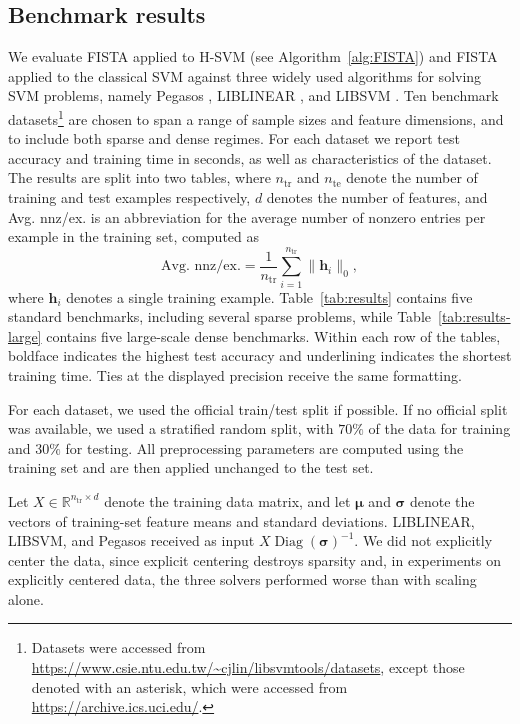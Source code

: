 \documentclass[twoside,11pt]{article}
\newcommand{\bmu}{\bm{\mu}}
\newcommand{\R}{{\mathbb{R}}} %
\newcommand{\Diag}{\mathop{\mathrm{Diag}}}
\newcommand\h{\bm{h}}
\newcommand\bsigma{\bm{\sigma}}
\begin{document}
\subsection{Benchmark results}
We evaluate FISTA applied to H-SVM (see Algorithm~\ref{alg:FISTA}) and FISTA applied to the classical SVM against three widely used algorithms for solving SVM problems, namely Pegasos \citep{Pegasos}, LIBLINEAR \citep{LIBLINEAR}, and LIBSVM \citep{LIBSVM}. Ten benchmark datasets\footnote{Datasets were accessed from \url{https://www.csie.ntu.edu.tw/~cjlin/libsvmtools/datasets}, except those denoted with an asterisk, which were accessed from \url{https://archive.ics.uci.edu/}.} are chosen to span a range of sample sizes and feature dimensions, and to include both sparse and dense regimes. For each dataset we report test accuracy and training time in seconds, as well as characteristics of the dataset. The results are split into two tables, where $n_{\text{tr}}$ and $n_{\text{te}}$ denote the number of training and test examples respectively, $d$ denotes the number of features, and Avg. nnz/ex. is an abbreviation for the average number of nonzero entries per example in the training set, computed as
\[
    \text{Avg. nnz/ex.} = \frac{1}{n_{\text{tr}}}\sum_{i=1}^{n_{\text{tr}}}\lVert \h_i\rVert_0,
\]
where $\h_i$ denotes a single training example. Table~\ref{tab:results} contains five standard benchmarks, including several sparse problems, while Table~\ref{tab:results-large} contains five large-scale dense benchmarks. Within each row of the tables, boldface indicates the highest test accuracy and underlining indicates the shortest training time. Ties at the displayed precision receive the same formatting.

For each dataset, we used the official train/test split if possible. If no official split was available, we used a stratified random split, with $70\%$ of the data for training and $30\%$ for testing. All preprocessing parameters are computed using the training set and are then applied unchanged to the test set.

Let $X \in \R^{n_{\mathrm{tr}}\times d}$ denote the training data matrix, and let $\bmu$ and $\bsigma$ denote the vectors of training-set feature means and standard deviations. LIBLINEAR, LIBSVM, and Pegasos received as input $X\Diag(\bsigma)^{-1}$.  We did not explicitly center the data, since explicit centering destroys sparsity and, in experiments on explicitly centered data, the three solvers performed worse than with scaling alone.
\end{document}
